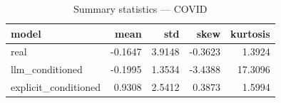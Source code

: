 \begin{table}
\caption{Summary statistics — COVID}
\label{tab:summary_COVID}
\begin{tabular}{lrrrr}
\toprule
model & mean & std & skew & kurtosis \\
\midrule
real & -0.1647 & 3.9148 & -0.3623 & 1.3924 \\
llm\_conditioned & -0.1995 & 1.3534 & -3.4388 & 17.3096 \\
explicit\_conditioned & 0.9308 & 2.5412 & 0.3873 & 1.5994 \\
\bottomrule
\end{tabular}
\end{table}
